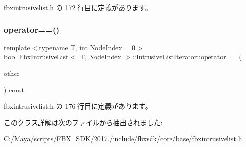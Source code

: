  fbxintrusivelist.\+h の 172 行目に定義があります。

\mbox{\label{class_fbx_intrusive_list_1_1_intrusive_list_iterator_a5d1689422d59c3ed59daeacb687b7a24}} 
\subsubsection{\texorpdfstring{operator==()}{operator==()}}
{\footnotesize\ttfamily template$<$typename T, int Node\+Index = 0$>$ \\
bool \hyperlink{class_fbx_intrusive_list}{Fbx\+Intrusive\+List}$<$ T, Node\+Index $>$\+::Intrusive\+List\+Iterator\+::operator== (\begin{DoxyParamCaption}\item[{const \hyperlink{class_fbx_intrusive_list_1_1_intrusive_list_iterator}{Intrusive\+List\+Iterator} \&}]{other }\end{DoxyParamCaption}) const\hspace{0.3cm}{\ttfamily [inline]}}



 fbxintrusivelist.\+h の 176 行目に定義があります。



このクラス詳解は次のファイルから抽出されました\+:\begin{DoxyCompactItemize}
\item 
C\+:/\+Maya/scripts/\+F\+B\+X\+\_\+\+S\+D\+K/2017./include/fbxsdk/core/base/\hyperlink{fbxintrusivelist_8h}{fbxintrusivelist.\+h}\end{DoxyCompactItemize}
